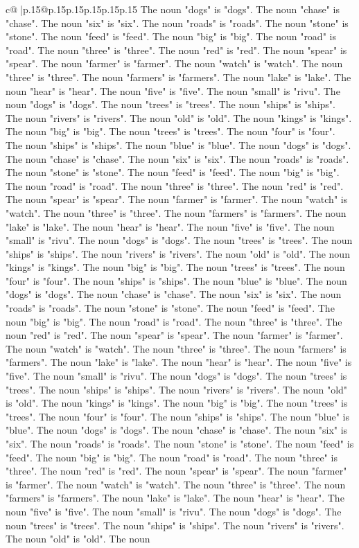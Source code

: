 \documentclass{article}
\begin{document}
{\begin{supertabular}{c@{$\;$}|p{.15\linewidth}@{}p{.15\linewidth}p{.15\linewidth}p{.15\linewidth}p{.15\linewidth}p{.15\linewidth}}
{{{The noun "dogs" is "dogs". The noun "chase" is "chase". The noun "six" is "six". The noun "roads" is "roads". The noun "stone" is "stone". The noun "feed" is "feed". The noun "big" is "big". The noun "road" is "road". The noun "three" is "three". The noun "red" is "red". The noun "spear" is "spear". The noun "farmer" is "farmer". The noun "watch" is "watch". The noun "three" is "three". The noun "farmers" is "farmers". The noun "lake" is "lake". The noun "hear" is "hear". The noun "five" is "five". The noun "small" is "rivu". The noun "dogs" is "dogs". The noun "trees" is "trees". The noun "ships" is "ships". The noun "rivers" is "rivers". The noun "old" is "old". The noun "kings" is "kings". The noun "big" is "big". The noun "trees" is "trees". The noun "four" is "four". The noun "ships" is "ships". The noun "blue" is "blue". The noun "dogs" is "dogs". The noun "chase" is "chase". The noun "six" is "six". The noun "roads" is "roads". The noun "stone" is "stone". The noun "feed" is "feed". The noun "big" is "big". The noun "road" is "road". The noun "three" is "three". The noun "red" is "red". The noun "spear" is "spear". The noun "farmer" is "farmer". The noun "watch" is "watch". The noun "three" is "three". The noun "farmers" is "farmers". The noun "lake" is "lake". The noun "hear" is "hear". The noun "five" is "five". The noun "small" is "rivu". The noun "dogs" is "dogs". The noun "trees" is "trees". The noun "ships" is "ships". The noun "rivers" is "rivers". The noun "old" is "old". The noun "kings" is "kings". The noun "big" is "big". The noun "trees" is "trees". The noun "four" is "four". The noun "ships" is "ships". The noun "blue" is "blue". The noun "dogs" is "dogs". The noun "chase" is "chase". The noun "six" is "six". The noun "roads" is "roads". The noun "stone" is "stone". The noun "feed" is "feed". The noun "big" is "big". The noun "road" is "road". The noun "three" is "three". The noun "red" is "red". The noun "spear" is "spear". The noun "farmer" is "farmer". The noun "watch" is "watch". The noun "three" is "three". The noun "farmers" is "farmers". The noun "lake" is "lake". The noun "hear" is "hear". The noun "five" is "five". The noun "small" is "rivu". The noun "dogs" is "dogs". The noun "trees" is "trees". The noun "ships" is "ships". The noun "rivers" is "rivers". The noun "old" is "old". The noun "kings" is "kings". The noun "big" is "big". The noun "trees" is "trees". The noun "four" is "four". The noun "ships" is "ships". The noun "blue" is "blue". The noun "dogs" is "dogs". The noun "chase" is "chase". The noun "six" is "six". The noun "roads" is "roads". The noun "stone" is "stone". The noun "feed" is "feed". The noun "big" is "big". The noun "road" is "road". The noun "three" is "three". The noun "red" is "red". The noun "spear" is "spear". The noun "farmer" is "farmer". The noun "watch" is "watch". The noun "three" is "three". The noun "farmers" is "farmers". The noun "lake" is "lake". The noun "hear" is "hear". The noun "five" is "five". The noun "small" is "rivu". The noun "dogs" is "dogs". The noun "trees" is "trees". The noun "ships" is "ships". The noun "rivers" is "rivers". The noun "old" is "old". The noun }}}
\end{supertabular}}
\end{document}
